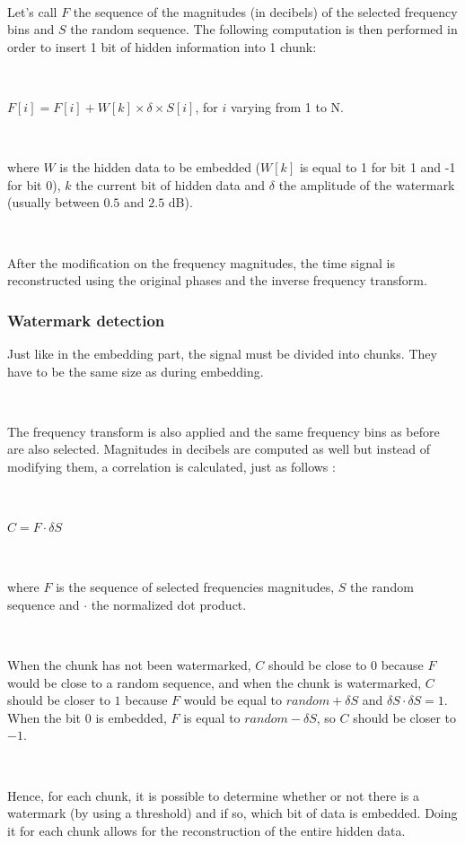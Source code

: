 ~

Let's call $F$ the sequence of the magnitudes (in decibels) of the selected frequency bins and $S$ the random sequence. The following computation is then performed in order to insert 1 bit of hidden information into 1 chunk:

~

$F[i] = F[i] + W[k] \times \delta \times S[i]$, for $i$ varying from 1 to N.

~

\noindent where $W$ is the hidden data to be embedded ($W[k]$ is equal to 1 for bit 1 and -1 for bit 0), $k$ the current bit of hidden data and $\delta$ the amplitude of the watermark (usually between $0.5$ and $2.5$ dB).

~

After the modification on the frequency magnitudes, the time signal is reconstructed using the original phases and the inverse frequency transform.

\subsubsection{Watermark detection}

Just like in the embedding part, the signal must be divided into chunks. They have to be the same size as during embedding.

~

The frequency transform is also applied and the same frequency bins as before are also selected. Magnitudes in decibels are computed as well but instead of modifying them, a correlation is calculated, just as follows :

~

$C = F \cdot \delta S$

~

\noindent where $F$ is the sequence of selected frequencies magnitudes, $S$ the random sequence and $\cdot$ the normalized dot product.

~

When the chunk has not been watermarked, $C$ should be close to $0$ because $F$ would be close to a random sequence, and when the chunk is watermarked, $C$ should be closer to $1$ because $F$ would be equal to $random + \delta S$ and $\delta S \cdot \delta S = 1$. When the bit 0 is embedded, $F$ is equal to $random - \delta S$, so $C$ should be closer to $-1$.

~

Hence, for each chunk, it is possible to determine whether or not there is a watermark (by using a threshold) and if so, which bit of data is embedded. Doing it for each chunk allows for the reconstruction of the entire hidden data.

